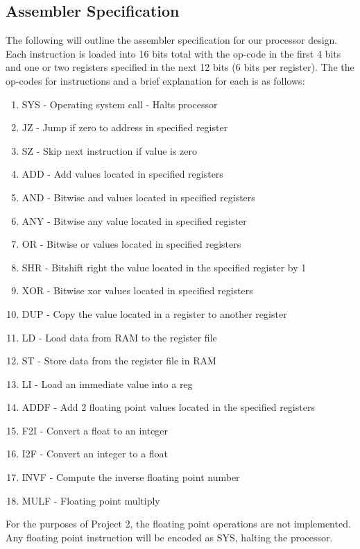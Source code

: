 \documentclass[conference]{IEEEtran}
\begin{document}
\subsection{Assembler Specification}
The following will outline the assembler specification for our processor design. 
Each instruction is loaded into 16 bits total with the op-code in the first 4 bits and one or two registers specified in the next 12 bits (6 bits per register).
The the op-codes for instructions and a brief explanation for each is as follows:
\begin{enumerate}
\item SYS  - Operating system call - Halts processor 
\item JZ   - Jump if zero to address in specified register
\item SZ   - Skip next instruction if value is zero
\item ADD  - Add values located in specified registers
\item AND  - Bitwise and values located in specified registers
\item ANY  - Bitwise any value located in specified register
\item OR   - Bitwise or values located in specified registers
\item SHR  - Bitshift right the value located in the specified register by 1
\item XOR  - Bitwise xor values located in specified registers
\item DUP  - Copy the value located in a register to another register
\item LD   - Load data from RAM to the register file
\item ST   - Store data from the register file in RAM
\item LI   - Load an immediate value into a reg
\item ADDF - Add 2 floating point values located in the specified registers
\item F2I  - Convert a float to an integer
\item I2F  - Convert an integer to a float
\item INVF - Compute the inverse floating point number
\item MULF - Floating point multiply
\end{enumerate}

For the purposes of Project 2, the floating point operations are not implemented.
Any floating point instruction will be encoded as SYS, halting the processor.
\end{document}
